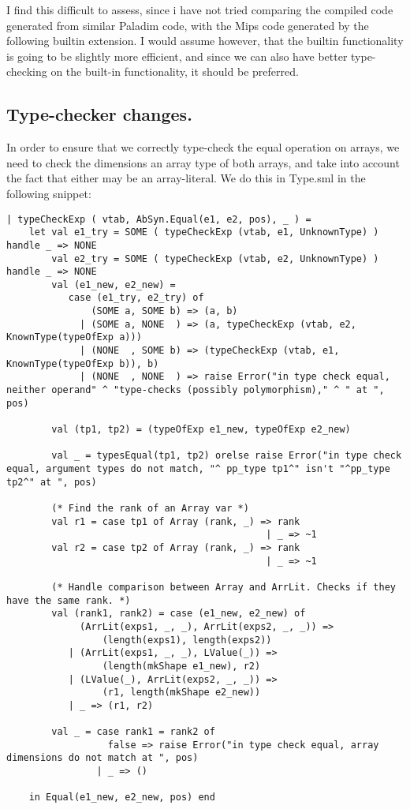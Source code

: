 \documentclass[12pt]{article}
\begin{document}
I find this difficult to assess, since i have not tried comparing the compiled code generated from similar Paladim code, with the Mips code generated by the following builtin extension. I would assume however, that the builtin functionality is going to be slightly more efficient, and since we can also have better type-checking on the built-in functionality, it should be preferred.

\subsection{Type-checker changes.}

In order to ensure that we correctly type-check the equal operation on arrays, we need to check the dimensions an array type of both arrays, and take into account the fact that either may be an array-literal. We do this in Type.sml in the following snippet:

\begin{lstlisting}[caption=Type.sml changes for array equality.]
| typeCheckExp ( vtab, AbSyn.Equal(e1, e2, pos), _ ) =
    let val e1_try = SOME ( typeCheckExp (vtab, e1, UnknownType) ) handle _ => NONE
        val e2_try = SOME ( typeCheckExp (vtab, e2, UnknownType) ) handle _ => NONE
        val (e1_new, e2_new) =
           case (e1_try, e2_try) of
               (SOME a, SOME b) => (a, b)
             | (SOME a, NONE  ) => (a, typeCheckExp (vtab, e2, KnownType(typeOfExp a)))
             | (NONE  , SOME b) => (typeCheckExp (vtab, e1, KnownType(typeOfExp b)), b)
             | (NONE  , NONE  ) => raise Error("in type check equal, neither operand" ^ "type-checks (possibly polymorphism)," ^ " at ", pos)

        val (tp1, tp2) = (typeOfExp e1_new, typeOfExp e2_new)

        val _ = typesEqual(tp1, tp2) orelse raise Error("in type check equal, argument types do not match, "^ pp_type tp1^" isn't "^pp_type tp2^" at ", pos)

        (* Find the rank of an Array var *)
        val r1 = case tp1 of Array (rank, _) => rank
                                              | _ => ~1
        val r2 = case tp2 of Array (rank, _) => rank
                                              | _ => ~1             

        (* Handle comparison between Array and ArrLit. Checks if they have the same rank. *)                                                
        val (rank1, rank2) = case (e1_new, e2_new) of 
             (ArrLit(exps1, _, _), ArrLit(exps2, _, _)) => 
                 (length(exps1), length(exps2))
           | (ArrLit(exps1, _, _), LValue(_)) =>
                 (length(mkShape e1_new), r2)
           | (LValue(_), ArrLit(exps2, _, _)) =>
                 (r1, length(mkShape e2_new))
           | _ => (r1, r2)

        val _ = case rank1 = rank2 of
                  false => raise Error("in type check equal, array dimensions do not match at ", pos)
                | _ => ()

    in Equal(e1_new, e2_new, pos) end
\end{lstlisting}
\end{document}
